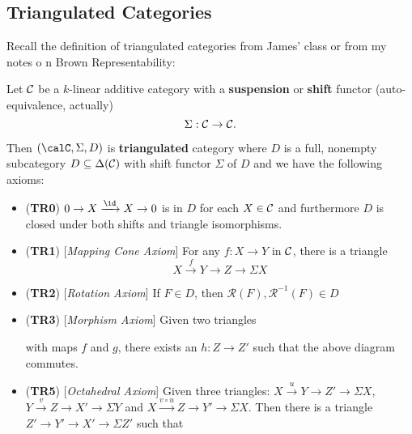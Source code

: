 \documentclass[12pt]{article}
\begin{document}
\subsection{Triangulated Categories}
Recall the definition of triangulated categories from James' class or from my notes o
n Brown Representability:
\begin{defn}
	Let $\cal C$ be a $k$-linear additive category with a \textbf{suspension} or \textbf{shift} functor (auto-equivalence, actually)
	\[\Sigma:\cal C\to\cal C.\]

	Then $({\calC}, \Sigma ,D)$ is \textbf{triangulated} category where $D$ is a full, nonempty subcategory $D\subseteq\Delta(\cal C)$
	with shift functor $\Sigma$ of $D$ and we have the following axioms:
	\begin{itemize}
		\item (\textbf{TR0}) $0\to X\xrightarrow{\id} X\to 0$ is in $D$ for each $X\in \cal C$ and furthermore $D$ is closed under both shifts and triangle isomorphisms.
		\item (\textbf{TR1}) [\textit{Mapping Cone Axiom}] For any $f:X\to Y$ in $\cal C$, there is a triangle
		\[X\xrightarrow{f} Y\to Z\to\Sigma X\]
		\item (\textbf{TR2}) [\textit{Rotation Axiom}] If $F\in D$, then $\mathscr R(F),\mathscr R^{-1}(F)\in D$
		\item (\textbf{TR3}) [\textit{Morphism Axiom}] Given two triangles 
		\begin{center}
		\end{center}
		with maps $f$ and $g$, there exists an $h:Z\to Z'$ such that the above diagram commutes.
		\item (\textbf{TR5}) [\textit{Octahedral Axiom}] Given three triangles: $X\xrightarrow{u}Y\to Z'\to\Sigma X$, $Y\xrightarrow{v}Z\to X'\to\Sigma Y$
		and $X\xrightarrow{v\circ u} Z\to Y'\to\Sigma X$. Then there is a triangle $Z'\to Y'\to X'\to\Sigma Z'$ such that
		\begin{center}
		\end{center}
	\end{itemize}
\end{defn}
\end{document}
